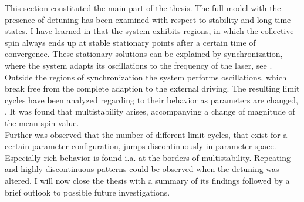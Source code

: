 This section constituted the main part of the thesis. The full model with the presence of detuning has been examined with respect to stability and long-time states. I have learned in  that the system exhibits regions, in which the collective spin always ends up at stable stationary points after a certain time of convergence. These stationary solutions can be explained by synchronization, where the system adapts its oscillations to the frequency of the laser, see . \\Outside the regions of synchronization the system performs oscillations, which break free from the complete adaption to the external driving. The resulting limit cycles have been analyzed regarding to their behavior as parameters are changed, . It was found that multistability arises, accompanying a change of magnitude of the mean spin value. \\Further was observed that the number of different limit cycles, that exist for a certain parameter configuration, jumps discontinuously in parameter space. Especially rich behavior is found i.a. at the borders of multistability. Repeating and highly discontinuous patterns could be observed when the detuning was altered. I will now close the thesis with a summary of its findings followed by a brief outlook to possible future investigations.


